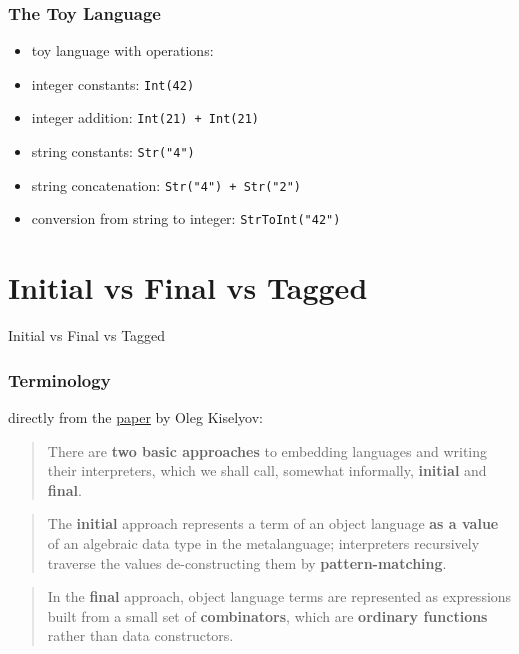 \documentclass[aspectratio=169, hyperref={colorlinks, linkcolor=beamer@centricgreen}, urlcolor=links]{beamer}
\begin{document}
\begin{frame}
  \frametitle{The Toy Language}
  \begin{itemize}
  \item toy language with operations:
  \item integer constants: \texttt{Int(42)}
  \item integer addition: \texttt{Int(21) + Int(21)}
  \item string constants: \texttt{Str("4")}
  \item string concatenation: \texttt{Str("4") + Str("2")}
  \item conversion from string to integer: \texttt{StrToInt("42")}
  \end{itemize}
\end{frame}

\section{Initial vs Final vs Tagged}\label{sec:initial-final-tagged}

\begin{frame}
  \begin{center}
    \Huge
    Initial vs Final vs Tagged
  \end{center}
\end{frame}

\begin{frame}
  \frametitle{Terminology}

  directly from the \href{http://okmij.org/ftp/tagless-final/course/lecture.pdf}{paper} by Oleg Kiselyov:
  \vfill
  \begin{quote}
    There are \textbf{two basic approaches} to embedding languages and
    writing their interpreters, which we shall call, somewhat
    informally, \textbf{initial} and \textbf{final}.
  \end{quote}
  \vfill
  \begin{quote}
    The \textbf{initial} approach represents a term of an object
    language \textbf{as a value} of an algebraic data type in the
    metalanguage; interpreters recursively traverse the values
    de-constructing them by \textbf{pattern-matching}.
  \end{quote}
  \vfill
  \begin{quote}
    In the \textbf{final} approach, object language terms are
    represented as expressions built from a small set of
    \textbf{combinators}, which are \textbf{ordinary functions} rather
    than data constructors.
  \end{quote}
\end{frame}
\end{document}
